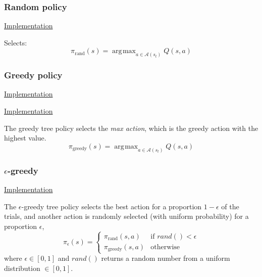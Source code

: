 \documentclass{article}
\DeclareMathOperator*{\argmax}{\arg\!\max}
\newcommand{\GithubURL}[2]{
\noindent
\href{https://github.com/davidrobles/mlnd-capstone-code/blob/master/#1}{#2}
\break
}
\begin{document}
\subsubsection{Random policy}

\GithubURL{capstone/policy/random_policy.py}{Implementation}

Selects:
%
\begin{equation}
    \pi_{\textrm{rand}}(s) = \argmax_{a \in \mathcal{A}(s_t)} Q(s, a)
\end{equation}

\subsubsection{Greedy policy}

\GithubURL{capstone/policy/greedy.py}{Implementation}

\noindent
\href{https://github.com/davidrobles/mlnd-capstone-code/blob/master/capstone/policy/greedy.py}
     {Implementation}
\break

The greedy tree policy selects the \emph{max action}, which is the greedy action with the highest
value.
%
\begin{equation}
    \pi_{\textrm{greedy}}(s) = \argmax_{a \in \mathcal{A}(s_t)} Q(s, a)
\end{equation}

\subsubsection{$\epsilon$-greedy}

\GithubURL{capstone/policy/egreedy.py}{Implementation}

The $\epsilon$-greedy tree policy selects the best action for a proportion $1 - \epsilon$ of the
trials, and another action is randomly selected (with uniform probability) for a proportion
$\epsilon$,
%
\begin{equation}
    \pi_{\epsilon}(s) = \left\{
     \begin{array}{lr}
         \pi_{\textrm{rand}}(s,a) & \text{if } rand() < \epsilon\\
         \pi_{\textrm{greedy}}(s,a) & \text{otherwise}
     \end{array}
   \right.
\end{equation}
%
where $\epsilon \in [0, 1]$ and $rand()$ returns a random number from a uniform distribution $\in
[0, 1]$.
\end{document}
